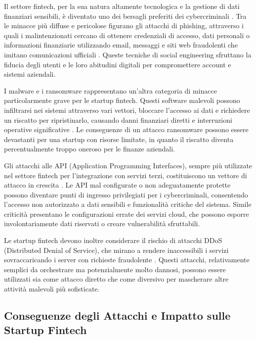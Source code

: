 \documentclass[a4paper,12pt]{report}
\begin{document}
Il settore fintech, per la sua natura altamente tecnologica e la gestione di dati finanziari sensibili, è diventato uno dei bersagli preferiti dei cybercriminali \cite{cyberThreatsFintech}. Tra le minacce più diffuse e pericolose figurano gli attacchi di phishing, attraverso i quali i malintenzionati cercano di ottenere credenziali di accesso, dati personali o informazioni finanziarie utilizzando email, messaggi e siti web fraudolenti che imitano comunicazioni ufficiali \cite{cyberThreatsFintech}. Queste tecniche di social engineering sfruttano la fiducia degli utenti e le loro abitudini digitali per compromettere account e sistemi aziendali.

I malware e i ransomware rappresentano un'altra categoria di minacce particolarmente grave per le startup fintech. Questi software malevoli possono infiltrarsi nei sistemi attraverso vari vettori, bloccare l'accesso ai dati e richiedere un riscatto per ripristinarlo, causando danni finanziari diretti e interruzioni operative significative \cite{cyberThreatsFintech}. Le conseguenze di un attacco ransomware possono essere devastanti per una startup con risorse limitate, in quanto il riscatto diventa percentualmente troppo oneroso per le finanze aziendali.

Gli attacchi alle API (Application Programming Interfaces), sempre più utilizzate nel settore fintech per l'integrazione con servizi terzi, costituiscono un vettore di attacco in crescita \cite{fintechChallenges}. Le API mal configurate o non adeguatamente protette possono diventare punti di ingresso privilegiati per i cybercriminali, consentendo l'accesso non autorizzato a dati sensibili e funzionalità critiche del sistema. Simile criticità presentano le configurazioni errate dei servizi cloud, che possono esporre involontariamente dati riservati o creare vulnerabilità sfruttabili.

Le startup fintech devono inoltre considerare il rischio di attacchi DDoS (Distributed Denial of Service), che mirano a rendere inaccessibili i servizi sovraccaricando i server con richieste fraudolente \cite{fintechChallenges}. Questi attacchi, relativamente semplici da orchestrare ma potenzialmente molto dannosi, possono essere utilizzati sia come attacco diretto che come diversivo per mascherare altre attività malevoli più sofisticate.

\subsection{Conseguenze degli Attacchi e Impatto sulle Startup Fintech}
\end{document}
